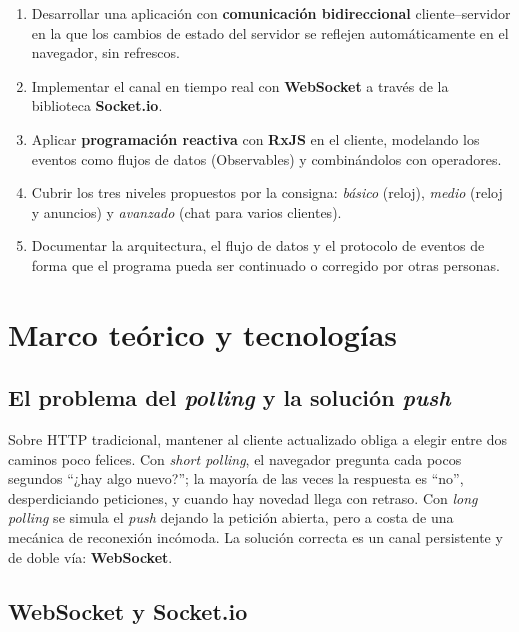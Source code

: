 \documentclass[12pt,a4paper]{article}
\begin{document}
\begin{enumerate}[leftmargin=1.4em]
    \item Desarrollar una aplicación con \textbf{comunicación bidireccional} cliente--servidor en la que los cambios de estado del servidor se reflejen automáticamente en el navegador, sin refrescos.
    \item Implementar el canal en tiempo real con \textbf{WebSocket} a través de la biblioteca \textbf{Socket.io}.
    \item Aplicar \textbf{programación reactiva} con \textbf{RxJS} en el cliente, modelando los eventos como flujos de datos (Observables) y combinándolos con operadores.
    \item Cubrir los tres niveles propuestos por la consigna: \textit{básico} (reloj), \textit{medio} (reloj y anuncios) y \textit{avanzado} (chat para varios clientes).
    \item Documentar la arquitectura, el flujo de datos y el protocolo de eventos de forma que el programa pueda ser continuado o corregido por otras personas.
\end{enumerate}

\section{Marco teórico y tecnologías}

\subsection{El problema del \textit{polling} y la solución \textit{push}}

Sobre HTTP tradicional, mantener al cliente actualizado obliga a elegir entre dos caminos poco felices. Con \textit{short polling}, el navegador pregunta cada pocos segundos ``¿hay algo nuevo?''; la mayoría de las veces la respuesta es ``no'', desperdiciando peticiones, y cuando hay novedad llega con retraso. Con \textit{long polling} se simula el \textit{push} dejando la petición abierta, pero a costa de una mecánica de reconexión incómoda. La solución correcta es un canal persistente y de doble vía: \textbf{WebSocket}.

\subsection{WebSocket y Socket.io}
\end{document}
